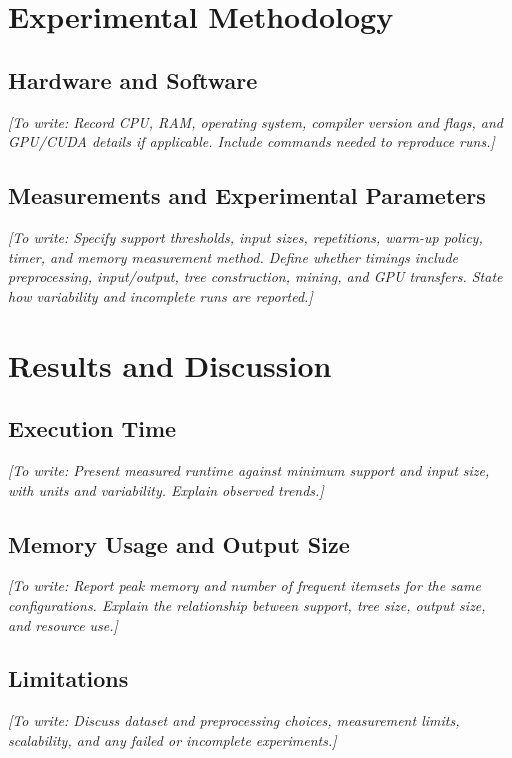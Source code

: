 \documentclass[12pt,letterpaper]{article}
\newcommand{\placeholder}[1]{\par\noindent\textit{[To write: #1]}\par}
\begin{document}
\section{Experimental Methodology}
\label{sec:methodology}
\subsection{Hardware and Software}
\placeholder{Record CPU, RAM, operating system, compiler version and flags,
and GPU/CUDA details if applicable. Include commands needed to reproduce runs.}

\subsection{Measurements and Experimental Parameters}
\placeholder{Specify support thresholds, input sizes, repetitions, warm-up
policy, timer, and memory measurement method. Define whether timings include
preprocessing, input/output, tree construction, mining, and GPU transfers.
State how variability and incomplete runs are reported.}

\section{Results and Discussion}
\label{sec:results}
\subsection{Execution Time}
\placeholder{Present measured runtime against minimum support and input
size, with units and variability. Explain observed trends.}

\subsection{Memory Usage and Output Size}
\placeholder{Report peak memory and number of frequent itemsets for the
same configurations. Explain the relationship between support, tree size,
output size, and resource use.}

\subsection{Limitations}
\placeholder{Discuss dataset and preprocessing choices, measurement limits,
scalability, and any failed or incomplete experiments.}
\end{document}
